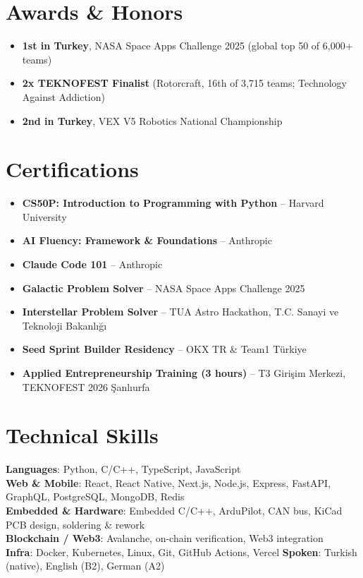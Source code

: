 \documentclass[letterpaper,11pt]{article}
\newcommand{\resumeItem}[1]{
  \item\small{
    {#1 \vspace{-2pt}}
  }
}
\newcommand{\resumeSubHeadingListStart}{\begin{itemize}[leftmargin=0.15in, label={}]}
\newcommand{\resumeSubHeadingListEnd}{\end{itemize}}
\begin{document}
\section{Awards \& Honors}
  \resumeSubHeadingListStart
    \resumeItem{\textbf{1st in Turkey}, NASA Space Apps Challenge 2025 (global top 50 of 6{,}000+ teams)}
    \resumeItem{\textbf{2x TEKNOFEST Finalist} (Rotorcraft, 16th of 3{,}715 teams; Technology Against Addiction)}
    \resumeItem{\textbf{2nd in Turkey}, VEX V5 Robotics National Championship}
  \resumeSubHeadingListEnd

\section{Certifications}
  \resumeSubHeadingListStart
    \resumeItem{\textbf{CS50P: Introduction to Programming with Python} -- Harvard University}
    \resumeItem{\textbf{AI Fluency: Framework \& Foundations} -- Anthropic}
    \resumeItem{\textbf{Claude Code 101} -- Anthropic}
    \resumeItem{\textbf{Galactic Problem Solver} -- NASA Space Apps Challenge 2025}
    \resumeItem{\textbf{Interstellar Problem Solver} -- TUA Astro Hackathon, T.C. Sanayi ve Teknoloji Bakanl\i\u{g}\i}
    \resumeItem{\textbf{Seed Sprint Builder Residency} -- OKX TR \& Team1 T\"urkiye}
    \resumeItem{\textbf{Applied Entrepreneurship Training (3 hours)} -- T3 Giri\c{s}im Merkezi, TEKNOFEST 2026 \c{S}anl\i urfa}
  \resumeSubHeadingListEnd

%
\section{Technical Skills}
 \begin{itemize}[leftmargin=0.15in, label={}]
    \small{\item{
     \textbf{Languages}{: Python, C/C++, TypeScript, JavaScript} \\
     \textbf{Web \& Mobile}{: React, React Native, Next.js, Node.js, Express, FastAPI, GraphQL, PostgreSQL, MongoDB, Redis} \\
     \textbf{Embedded \& Hardware}{: Embedded C/C++, ArduPilot, CAN bus, KiCad PCB design, soldering \& rework} \\
     \textbf{Blockchain / Web3}{: Avalanche, on-chain verification, Web3 integration} \\
     \textbf{Infra}{: Docker, Kubernetes, Linux, Git, GitHub Actions, Vercel \quad \textbf{Spoken}: Turkish (native), English (B2), German (A2)}
    }}
 \end{itemize}


\end{document}
